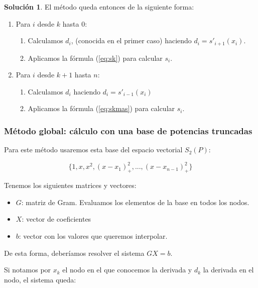 \documentclass[11pt,spanish,]{article}
\theoremstyle{definition} \newtheorem*{definicion}{Definición}
\newtheorem*{solucion}{Solución}
\begin{document}
\begin{solucion}
El método queda entonces de la siguiente forma:

\begin{enumerate}

\item Para $i$ desde $k$ hasta $0$:
\begin{enumerate}
\item Calculamos $d_i$, (conocida en el primer caso) haciendo $d_i = s'_{i+1}(x_i)$.
\item Aplicamos la fórmula (\ref{eq:sk}) para calcular $s_i$.
\end{enumerate}

\item Para $i$ desde $k+1$ hasta $n$:
\begin{enumerate}
\item Calculamos $d_i$ haciendo $d_i = s'_{i-1}(x_{i})$
\item Aplicamos la fórmula (\ref{eq:skmas}) para calcular $s_i$.
\end{enumerate}
\end{enumerate}

\end{solucion}

\vspace*{2\baselineskip}

\subsubsection{Método global: cálculo con una base de potencias
truncadas}\label{muxe9todo-global-cuxe1lculo-con-una-base-de-potencias-truncadas}

Para este método usaremos esta base del espacio vectorial $S_2(P)$:

\[\{1, x, x^2, (x-x_1)_+^2, ... , (x-x_{n-1})_+^2\}\]

Tenemos los siguientes matrices y vectores:

\begin{itemize}
\itemsep1pt\parskip0pt
\item
  $G$: matriz de Gram. Evaluamos los elementos de la base en todos los
  nodos.
\item
  $X$: vector de coeficientes
\item
  $b$: vector con los valores que queremos interpolar.
\end{itemize}

De esta forma, deberíamos resolver el sistema $GX=b$.

Si notamos por $x_k$ el nodo en el que conocemos la derivada y $d_k$ la
derivada en el nodo, el sistema queda:
\end{document}

